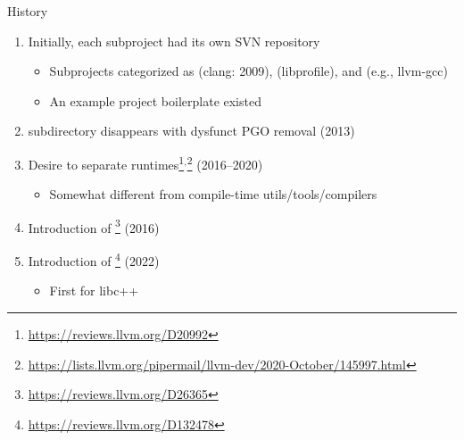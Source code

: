 \begin{frame}[fragile]{History}
\begin{enumerate}
\item<1-> Initially, each subproject had its own SVN repository
  \begin{itemize}
  \item Subprojects categorized as  (clang: 2009),  (libprofile), and  (e.g., llvm-gcc)
  \item An example project boilerplate existed
  \end{itemize}
\item<2->  subdirectory disappears with dysfunct PGO removal (2013)
 
\item<3-> Desire to separate runtimes\footnote{\url{https://reviews.llvm.org/D20992}}$^\text{,}$\footnote{%
 \url{https://lists.llvm.org/pipermail/llvm-dev/2020-October/145997.html}} (2016--2020)
  \begin{itemize}
  \item Somewhat different from compile-time utils/tools/compilers
  \end{itemize}
  
\item<4-> Introduction of \footnote{\url{https://reviews.llvm.org/D26365}} (2016)
\item<4-> Introduction of \footnote{\url{https://reviews.llvm.org/D132478}} (2022)
  \begin{itemize}
  \item First for libc++
  \end{itemize}
\end{enumerate}
\end{frame}

